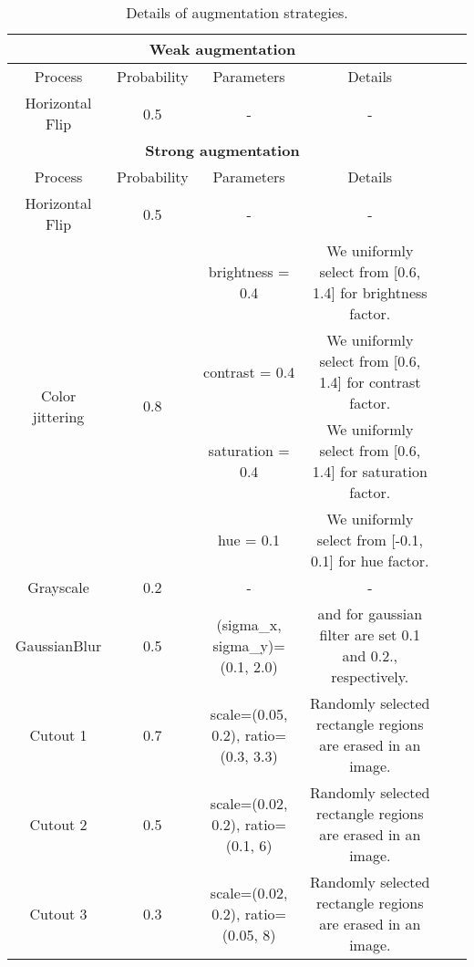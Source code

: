 \documentclass{bmvc2k}
\begin{document}
\begin{table}[h]
\centering
\tiny
\begin{tabular}{cccccc}
\toprule
\multicolumn{4}{c}{\textbf{Weak augmentation}} \\
\toprule
Process & Probability & Parameters & Details\\
\midrule
Horizontal Flip & 0.5 & - & - \\
\toprule
\toprule
\multicolumn{4}{c}{\textbf{Strong augmentation}} \\
\toprule
Process & Probability & Parameters & Details\\
\midrule
Horizontal Flip & 0.5 & - & - \\
\midrule
\multirow{4}{*}{Color jittering} & \multirow{4}{*}{0.8} & brightness = 0.4 & We uniformly select from [0.6, 1.4] for brightness factor. \\
{} & {} & contrast = 0.4 & We uniformly select from [0.6, 1.4] for contrast factor. \\
{} & {} & saturation = 0.4 & We uniformly select from [0.6, 1.4] for saturation factor. \\
{} & {} & hue = 0.1 & We uniformly select from [-0.1, 0.1] for hue factor. \\
\midrule
Grayscale & 0.2 & - & - \\
\midrule
GaussianBlur & 0.5 & (sigma\_x, sigma\_y)=(0.1, 2.0) &  and  for gaussian filter are set 0.1 and 0.2., respectively. \\
\midrule
Cutout 1 & 0.7 & scale=(0.05, 0.2), ratio=(0.3, 3.3) & Randomly selected rectangle regions are erased in an image. \\
\midrule
Cutout 2 & 0.5 & scale=(0.02, 0.2), ratio=(0.1, 6)  & Randomly selected rectangle regions are erased in an image. \\
\midrule
Cutout 3 & 0.3 & scale=(0.02, 0.2), ratio=(0.05, 8)  & Randomly selected rectangle regions are erased in an image. \\
\bottomrule
\end{tabular}\caption{Details of augmentation strategies.}
\label{tab:augmentation}
\end{table}
\end{document}

